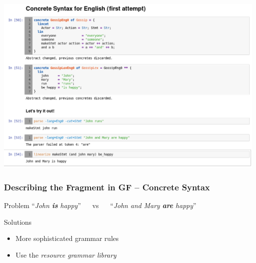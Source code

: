 \documentclass[dvipsnames]{beamer}
\def\GF{\textsf{GF}\xspace}
\def\str#1{``\textit{#1}''}   %
\begin{document}
\begin{frame}
    \includegraphics[scale=0.38]{screenshot_jupyter.png}
\end{frame}

\begin{frame}
    \frametitle{Describing the Fragment in \GF{} -- Concrete Syntax}

    \begin{block}{Problem}
        \str{John \textbf{is} happy} $\quad$ vs $\quad$ \str{John and Mary \textbf{are} happy}
    \end{block}

    \vspace{2em}
    \begin{block}{Solutions}
        \begin{itemize}
            \item More sophisticated grammar rules
            \item Use the \emph{resource grammar library}
        \end{itemize}
    \end{block}
\end{frame}
\end{document}
